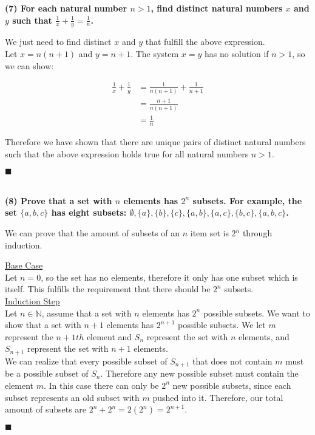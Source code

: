 \documentclass[20pt]{article}
\begin{document}
\newpage
\noindent
\textbf{(7)  For each natural number $n > 1$, find distinct natural numbers $x$ and $y$ such that $\frac{1}{x}+\frac{1}{y}=\frac{1}{n}$.}\\
\begin{text}
    We just need to find distinct $x$ and $y$ that fulfill the above expression.\\
    
    \noindent
    Let $x = n(n+1)$ and $y = n + 1$. The system $x = y$ has no solution if $n > 1$, so we can show:
    
    \begin{align}
        \frac{1}{x} + \frac{1}{y} &= \frac{1}{n(n+1)} + \frac{1}{n+1}\nonumber\\
        &= \frac{n + 1}{n(n+1)}\nonumber\\
        &= \frac{1}{n}\nonumber
    \end{align}
    
    \noindent
    Therefore we have shown that there are unique pairs of distinct natural numbers such that the above expression holds true for all natural numbers $n > 1$.
    
    \hfill $\blacksquare$
\end{text}\\

\noindent
\textbf{(8) Prove that a set with $n$ elements has $2^n$ subsets. For example, the set $\{a, b, c\}$ has eight subsets: $\emptyset, \{a\}, \{b\}, \{c\}, \{a, b\}, \{a, c\}, \{b, c\}, \{a, b, c\}$.}\\
\begin{text}
    We can prove that the amount of subsets of an $n$ item set is $2^n$ through induction.
    
    \noindent
    \underline{Base Case}\\
    Let $n = 0$, so the set has no elements, therefore it only has one subset which is itself. This fulfills the requirement that there should be $2^n$ subsets.\\
    
    \noindent
    \underline{Induction Step}\\
    Let $n \in \mathbb{N}$, assume that a set with $n$ elements has $2^n$ possible subsets. We want to show that a set with $n + 1$ elements has $2^{n+1}$ possible subsets. We let $m$ represent the $n + 1 th$ element and $S_{n}$ represent the set with $n$ elements, and $S_{n+1}$ represent the set with $n + 1$ elements.\\
    
    \noindent
    We can realize that every possible subset of $S_{n+1}$ that does not contain $m$ must be a possible subset of $S_{n}$. Therefore any new possible subset must contain the element $m$. In this case there can only be $2^n$ new possible subsets, since each subset represents an old subset with $m$ pushed into it. Therefore, our total amount of subsets are $2^n + 2^n = 2(2^n) = 2^{n+1}$.
    
    \hfill $\blacksquare$
\end{text}\\
\end{document}
